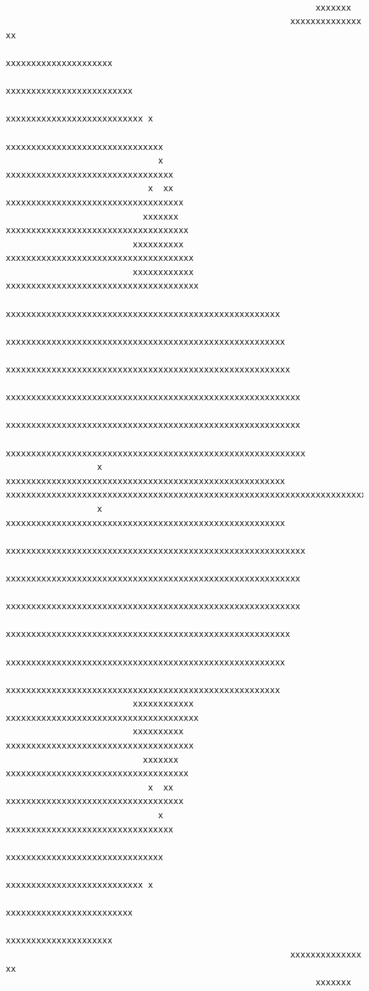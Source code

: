 ﻿\documentclass{article}
\begin{document}
\begin{verbatim}

                                                             xxxxxxx           
                                                        xxxxxxxxxxxxxx   xx    
                                                   xxxxxxxxxxxxxxxxxxxxx       
                                                 xxxxxxxxxxxxxxxxxxxxxxxxx     
                                                xxxxxxxxxxxxxxxxxxxxxxxxxxx x  
                                               xxxxxxxxxxxxxxxxxxxxxxxxxxxxxxx 
                              x               xxxxxxxxxxxxxxxxxxxxxxxxxxxxxxxxx
                            x  xx           xxxxxxxxxxxxxxxxxxxxxxxxxxxxxxxxxxx
                           xxxxxxx         xxxxxxxxxxxxxxxxxxxxxxxxxxxxxxxxxxxx
                         xxxxxxxxxx       xxxxxxxxxxxxxxxxxxxxxxxxxxxxxxxxxxxxx
                         xxxxxxxxxxxx    xxxxxxxxxxxxxxxxxxxxxxxxxxxxxxxxxxxxxx
                         xxxxxxxxxxxxxxxxxxxxxxxxxxxxxxxxxxxxxxxxxxxxxxxxxxxxxx
                        xxxxxxxxxxxxxxxxxxxxxxxxxxxxxxxxxxxxxxxxxxxxxxxxxxxxxxx
                       xxxxxxxxxxxxxxxxxxxxxxxxxxxxxxxxxxxxxxxxxxxxxxxxxxxxxxxx
                     xxxxxxxxxxxxxxxxxxxxxxxxxxxxxxxxxxxxxxxxxxxxxxxxxxxxxxxxxx
                    xxxxxxxxxxxxxxxxxxxxxxxxxxxxxxxxxxxxxxxxxxxxxxxxxxxxxxxxxx 
                    xxxxxxxxxxxxxxxxxxxxxxxxxxxxxxxxxxxxxxxxxxxxxxxxxxxxxxxxxxx
                  x xxxxxxxxxxxxxxxxxxxxxxxxxxxxxxxxxxxxxxxxxxxxxxxxxxxxxxx    
xxxxxxxxxxxxxxxxxxxxxxxxxxxxxxxxxxxxxxxxxxxxxxxxxxxxxxxxxxxxxxxxxxxxxxx        
                  x xxxxxxxxxxxxxxxxxxxxxxxxxxxxxxxxxxxxxxxxxxxxxxxxxxxxxxx    
                    xxxxxxxxxxxxxxxxxxxxxxxxxxxxxxxxxxxxxxxxxxxxxxxxxxxxxxxxxxx
                    xxxxxxxxxxxxxxxxxxxxxxxxxxxxxxxxxxxxxxxxxxxxxxxxxxxxxxxxxx 
                     xxxxxxxxxxxxxxxxxxxxxxxxxxxxxxxxxxxxxxxxxxxxxxxxxxxxxxxxxx
                       xxxxxxxxxxxxxxxxxxxxxxxxxxxxxxxxxxxxxxxxxxxxxxxxxxxxxxxx
                        xxxxxxxxxxxxxxxxxxxxxxxxxxxxxxxxxxxxxxxxxxxxxxxxxxxxxxx
                         xxxxxxxxxxxxxxxxxxxxxxxxxxxxxxxxxxxxxxxxxxxxxxxxxxxxxx
                         xxxxxxxxxxxx    xxxxxxxxxxxxxxxxxxxxxxxxxxxxxxxxxxxxxx
                         xxxxxxxxxx       xxxxxxxxxxxxxxxxxxxxxxxxxxxxxxxxxxxxx
                           xxxxxxx         xxxxxxxxxxxxxxxxxxxxxxxxxxxxxxxxxxxx
                            x  xx           xxxxxxxxxxxxxxxxxxxxxxxxxxxxxxxxxxx
                              x               xxxxxxxxxxxxxxxxxxxxxxxxxxxxxxxxx
                                               xxxxxxxxxxxxxxxxxxxxxxxxxxxxxxx 
                                                xxxxxxxxxxxxxxxxxxxxxxxxxxx x  
                                                 xxxxxxxxxxxxxxxxxxxxxxxxx     
                                                   xxxxxxxxxxxxxxxxxxxxx       
                                                        xxxxxxxxxxxxxx   xx    
                                                             xxxxxxx           
\end{verbatim}
\end{document}
